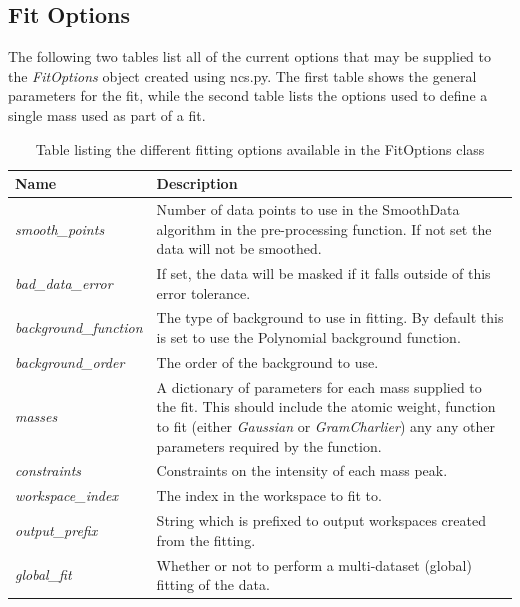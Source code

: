 \documentclass[paper=a4, fontsize=11pt]{scrartcl}	%
\numberwithin{equation}{section}															%
\numberwithin{figure}{section}																%
\numberwithin{table}{section}
\begin{document}
\clearpage



\clearpage
\begin{appendices}
\section{Fit Options}
\label{sec:fit-options}
The following two tables list all of the current options that may be supplied to the \textit{FitOptions} object created using ncs.py. The first table shows the general parameters for the fit, while the second table lists the options used to define a single mass used as part of a fit.

\begin{table}[H]
\centering
\begin{tabular}{ l p{12cm}}
Name & Description \\ \hline
\textit{smooth\_points} & Number of data points to use in the SmoothData algorithm in the pre-processing function. If not set the data will not be smoothed. \\ \hline
\textit{bad\_data\_error} & If set, the data will be masked if it falls outside of this error tolerance.\\ \hline
\textit{background\_function} & The type of background to use in fitting. By default this is set to use the Polynomial background function. \\ \hline
\textit{background\_order} & The order of the background to use.\\ \hline
\textit{masses} & A dictionary of parameters for each mass supplied to the fit. This should include the atomic weight, function to fit (either \textit{Gaussian} or \textit{GramCharlier}) any any other parameters required by the function. \\ \hline
\textit{constraints} & Constraints on the intensity of each mass peak. \\ \hline
\textit{workspace\_index} & The index in the workspace to fit to. \\ \hline
\textit{output\_prefix} & String which is prefixed to output workspaces created from the fitting. \\ \hline
\textit{global\_fit} & Whether or not to perform a multi-dataset (global) fitting of the data. \\ \hline
\end{tabular}
\caption{Table listing the different fitting options available in the FitOptions class}
\label{table:fit-parameters}
\end{table}


\end{appendices}
\end{document}
